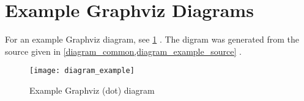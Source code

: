 


\section{Example Graphviz Diagrams}

For an example Graphviz diagram, see
\cref{diagram_example}%
.
The digram was generated from the source given in
\cref{diagram_common,diagram_example_source}%
.

\begin{figure}[h]
    \centering
    \texttt{[image: diagram\_example]}
    \caption{Example Graphviz (dot) diagram}
    \label{diagram_example}
\end{figure}



